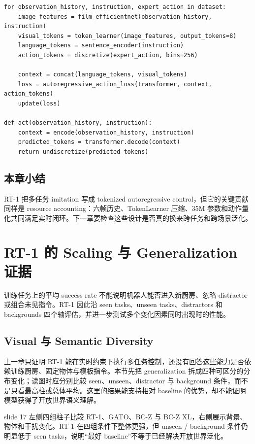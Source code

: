 \documentclass[a4paper]{article}
\begin{document}
\begin{lstlisting}[caption={RT-1-style tokenized imitation loop},label={lst:rt1-loop}]
for observation_history, instruction, expert_action in dataset:
    image_features = film_efficientnet(observation_history, instruction)
    visual_tokens = token_learner(image_features, output_tokens=8)
    language_tokens = sentence_encoder(instruction)
    action_tokens = discretize(expert_action, bins=256)

    context = concat(language_tokens, visual_tokens)
    loss = autoregressive_action_loss(transformer, context, action_tokens)
    update(loss)

def act(observation_history, instruction):
    context = encode(observation_history, instruction)
    predicted_tokens = transformer.decode(context)
    return undiscretize(predicted_tokens)
\end{lstlisting}

\subsection{本章小结}

RT-1 把多任务 imitation 写成 tokenized autoregressive control，但它的关键贡献同样是 resource accounting：六帧历史、TokenLearner 压缩、35M 参数和动作量化共同满足实时闭环。下一章要检查这些设计是否真的换来跨任务和跨场景泛化。

\section{RT-1 的 Scaling 与 Generalization 证据}

训练任务上的平均 success rate 不能说明机器人能否进入新厨房、忽略 distractor 或组合未见指令。RT-1 因此沿 seen tasks、unseen tasks、distractors 和 backgrounds 四个轴评估，并进一步测试多个变化因素同时出现时的性能。

\subsection{Visual 与 Semantic Diversity}

上一章只证明 RT-1 能在实时约束下执行多任务控制，还没有回答这些能力是否依赖训练厨房、固定物体与模板指令。本节先把 generalization 拆成四种可区分的分布变化；读图时应分别比较 seen、unseen、distractor 与 background 条件，而不是只看最高柱或总体平均。这里的结果能支持相对 baseline 的优势，却不能证明模型获得了开放世界语义理解。

slide 17 左侧四组柱子比较 RT-1、GATO、BC-Z 与 BC-Z XL，右侧展示背景、物体和干扰变化。RT-1 在四组条件下整体更强，但 unseen / background 条件仍明显低于 seen tasks，说明“最好 baseline”不等于已经解决开放世界泛化。
\end{document}
